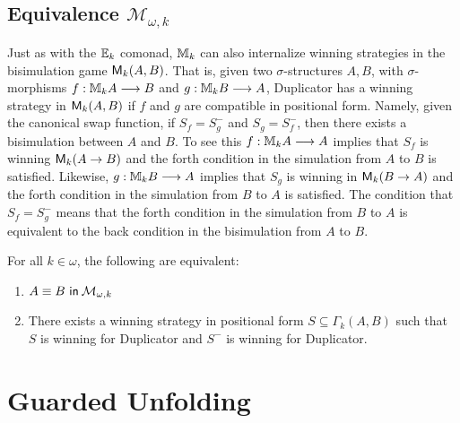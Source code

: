 \subsection{Equivalence $\mathcal{M}_{\omega,k}$}
Just as with the ${\mathbb{E}_{k}}$ comonad, ${\mathbb{M}_{k}}$ can also internalize winning strategies in the bisimulation game ${\mathsf{M}_{k}(A,B)}$. That is, given two $\sigma$-structures $A,B$, with $\sigma$-morphisms $f:{\mathbb{M}_{k}A} \longrightarrow B$ and $g:{\mathbb{M}_{k}B} \longrightarrow A$, Duplicator has a winning strategy in ${\mathsf{M}_{k}(A,B)}$ if $f$ and $g$ are compatible in positional form. Namely, given the canonical swap function, if $S_{f} = S_{g}^{-}$ and $S_{g} = S_{f}^{-}$, then there exists a bisimulation between $A$ and $B$. To see this $f:{\mathbb{M}_{k}A} \longrightarrow A$ implies that $S_{f}$ is winning ${\mathsf{M}_{k}(A \rightarrow B)}$ and the forth condition in the simulation from $A$ to $B$ is satisfied. Likewise, $g:{\mathbb{M}_{k}B} \longrightarrow A$ implies that $S_{g}$ is winning in ${\mathsf{M}_{k}(B \rightarrow A)}$ and the forth condition in the simulation from $B$ to $A$ is satisfied. The condition that $S_{f} = S_{g}^{-}$ means that the forth condition in the simulation from $B$ to $A$ is equivalent to the back condition in the bisimulation from $A$ to $B$. 
\begin{prop}
For all $k \in \omega$, the following are equivalent:
\begin{enumerate}[label=(\arabic*)$_{k}$]
\item ${A \equiv B \ \mathsf{in}\: \mathcal{M}_{\omega,k}}$ 
\item There exists a winning strategy in positional form $S \subseteq \Gamma_{k}(A,B)$ such that $S$ is winning for Duplicator and $S
^{-}$ is winning for Duplicator. 
\end{enumerate}
\end{prop}
\section{Guarded Unfolding}
